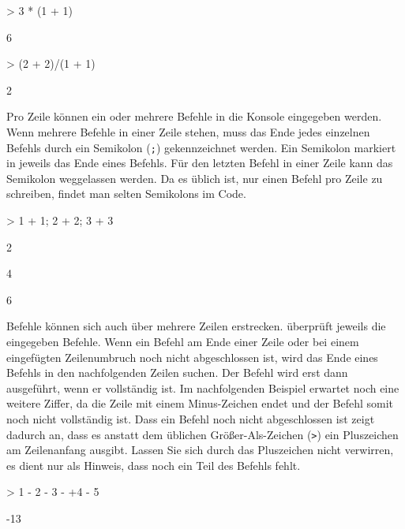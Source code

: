 \begin{Schunk}
\begin{Sinput}
> 3 * (1 + 1) 
\end{Sinput}
\begin{Soutput}
[1] 6
\end{Soutput}
\begin{Sinput}
> (2 + 2)/(1 + 1)
\end{Sinput}
\begin{Soutput}
[1] 2
\end{Soutput}
\end{Schunk}

Pro Zeile können ein oder mehrere Befehle in die \R{} Konsole eingegeben werden. Wenn mehrere Befehle in einer Zeile stehen, muss das Ende jedes einzelnen Befehls durch ein Semikolon (\texttt{;}) gekennzeichnet werden. Ein Semikolon markiert in \R{} jeweils das Ende eines Befehls. Für den letzten Befehl in einer Zeile kann das Semikolon weggelassen werden. Da es üblich ist, nur einen Befehl pro Zeile zu schreiben, findet man selten Semikolons im \R{} Code.

\begin{Schunk}
\begin{Sinput}
> 1 + 1; 2 + 2; 3 + 3
\end{Sinput}
\begin{Soutput}
[1] 2
\end{Soutput}
\begin{Soutput}
[1] 4
\end{Soutput}
\begin{Soutput}
[1] 6
\end{Soutput}
\end{Schunk}

Befehle können sich auch über mehrere Zeilen erstrecken. \R{} überprüft jeweils die eingegeben Befehle. Wenn ein Befehl am Ende einer Zeile oder bei einem eingefügten Zeilenumbruch noch nicht abgeschlossen ist, wird \R{} das Ende eines Befehls in den nachfolgenden Zeilen suchen. Der Befehl wird erst dann ausgeführt, wenn er vollständig ist. Im nachfolgenden Beispiel erwartet \R{} noch eine weitere Ziffer, da die Zeile mit einem Minus-Zeichen endet und der Befehl somit noch nicht vollständig ist. Dass ein Befehl noch nicht abgeschlossen ist zeigt \R{} dadurch an, dass es anstatt dem üblichen Größer-Als-Zeichen (\texttt{>}) ein Pluszeichen am Zeilenanfang ausgibt. Lassen Sie sich durch das Pluszeichen nicht verwirren, es dient nur als Hinweis, dass noch ein Teil des Befehls fehlt.

\begin{Schunk}
\begin{Sinput}
> 1 - 2 - 3 - 
+4 - 5
\end{Sinput}
\begin{Soutput}
[1] -13
\end{Soutput}
\end{Schunk}

